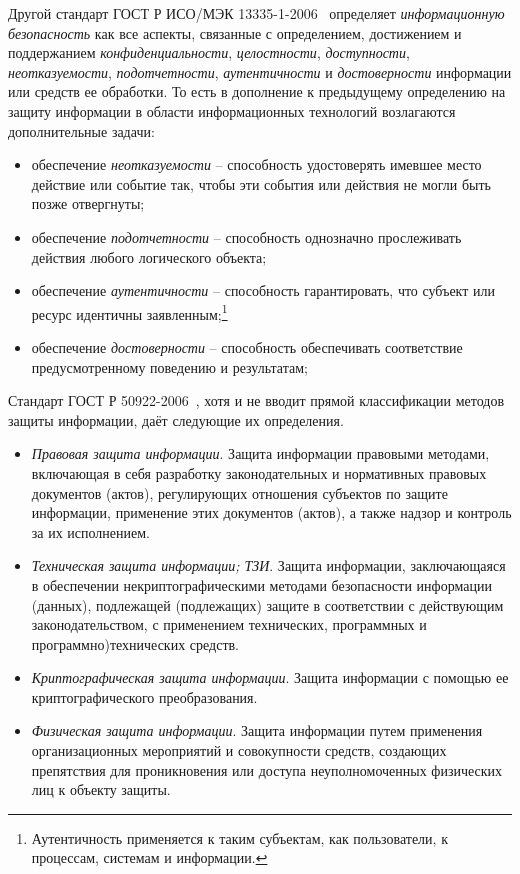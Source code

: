 Другой стандарт ГОСТ Р ИСО/МЭК 13335-1-2006~\cite{GOST-13335-1-2006} определяет \emph{информационную безопасность} как все аспекты, связанные с определением, достижением и поддержанием \emph{конфиденциальности}, \emph{целостности}, \emph{доступности}, \emph{неотказуемости}, \emph{подотчетности}, \emph{аутентичности} и \emph{достоверности} информации или средств ее обработки. То есть в дополнение к предыдущему определению на защиту информации в области информационных технологий возлагаются дополнительные задачи:
\begin{itemize}
	\item обеспечение \emph{неотказуемости} -- способность удостоверять имевшее место действие или событие так, чтобы эти события или действия не могли быть позже отвергнуты;
	\item обеспечение \emph{подотчетности} -- способность однозначно прослеживать действия любого логического объекта;
	\item обеспечение \emph{аутентичности} -- способность гарантировать, что субъект или ресурс идентичны заявленным;\footnote{Аутентичность применяется к таким субъектам, как пользователи, к процессам, системам и информации.}
	\item обеспечение \emph{достоверности} -- способность обеспечивать соответствие предусмотренному поведению и результатам;
\end{itemize}

Стандарт ГОСТ Р 50922-2006~\cite{GOST-50922-2006}, хотя и не вводит прямой классификации методов защиты информации, даёт следующие их определения.
\begin{itemize}
	\item \emph{Правовая защита информации}. Защита информации правовыми методами, включающая в себя разработку законодательных и нормативных правовых документов (актов), регулирующих отношения субъектов по защите информации, применение этих документов (актов), а также надзор и контроль за их исполнением.
	\item \emph{Техническая защита информации; ТЗИ}. Защита информации, заключающаяся в обеспечении некриптографическими методами безопасности информации (данных), подлежащей (подлежащих) защите в соответствии с действующим законодательством, с применением технических, программных и программно)технических средств.
	\item \emph{Криптографическая защита информации}. Защита информации с помощью ее криптографического преобразования.
	\item \emph{Физическая защита информации}. Защита информации путем применения организационных мероприятий и совокупности средств, создающих препятствия для проникновения или доступа неуполномоченных физических лиц к объекту защиты.
\end{itemize}


